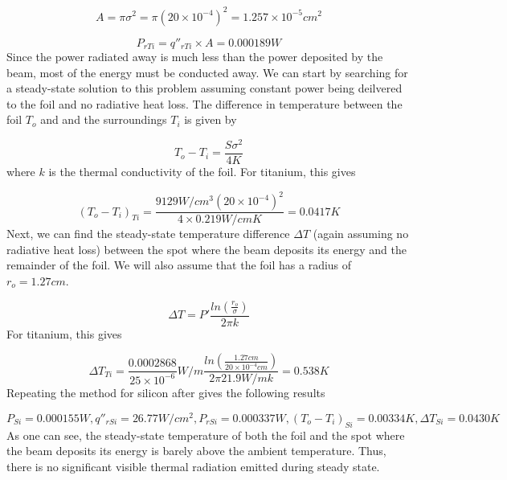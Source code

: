 \documentclass[12pt]{article}
\begin{document}
\begin{equation}
A=\pi \sigma^{2}=\pi (20 \times 10^{-4})^2=1.257 \times 10^{-5} cm^2
\end{equation}

\begin{equation}
P_{r Ti}=q''_{r Ti} \times A=0.000189 W
\end{equation}
Since the power radiated away is much less than the power deposited by the beam, most of the energy must be conducted away. We can start by searching for a steady-state solution to this problem assuming constant power being deilvered to the foil and no radiative heat loss. The difference in temperature between the foil $T_o$ and and the surroundings $T_i$ is given by

\begin{equation}
T_o-T_i=\frac{S \sigma^{2}}{4 K}
\end{equation}
where $k$ is the thermal conductivity of the foil. For titanium, this gives

\begin{equation}
(T_o-T_i)_{Ti}=\frac{9129 W/cm^3 (20 \times 10^{-4})^{2}}{4 \times 0.219 W/cm K}=0.0417 K
\end{equation}
Next, we can find the steady-state temperature difference $\Delta T$ (again assuming no radiative heat loss) between the spot where the beam deposits its energy and the remainder of the foil. We will also assume that the foil has a radius of $r_o=1.27 cm$. 

\begin{equation}
\Delta T=P' \frac{ln(\frac{r_o}{\sigma})}{2 \pi k}
\end{equation}
For titanium, this gives

\begin{equation}
\Delta T_{Ti}=\frac{0.0002868}{25 \times 10^{-6}} W/m \frac{ln(\frac{1.27 cm}{20 \times 10^{-4} cm})}{2 \pi 21.9 W/mk}=0.538 K
\end{equation}
Repeating the method for silicon after gives the following results

\begin{equation}
P_{Si}= 0.000155 W, q''_{r Si}=26.77 W/cm^2 , P_{r Si}=0.000337 W , (T_o-T_i)_{Si}=0.00334 K , \Delta T_{Si}=0.0430 K
\end{equation}
As one can see, the steady-state temperature of both the foil and the spot where the beam deposits its energy is barely above the ambient temperature. Thus, there is no significant visible thermal radiation emitted during steady state.
\end{document}

